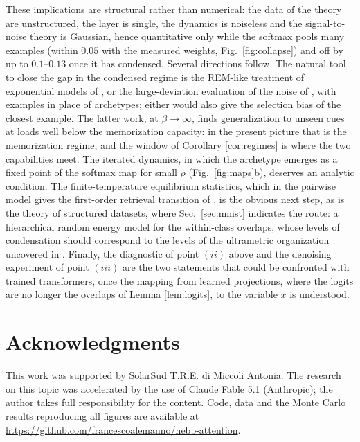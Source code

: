 \documentclass[11pt,a4paper]{article}
\begin{document}
These implications are structural rather than numerical: the data of the theory are unstructured, the layer is single, the dynamics is noiseless and the signal-to-noise theory is Gaussian, hence quantitative only while the softmax pools many examples (within $0.05$ with the measured weights, Fig.\ \ref{fig:collapse}) and off by up to $0.1$--$0.13$ once it has condensed. Several directions follow. The natural tool to close the gap in the condensed regime is the REM-like treatment of exponential models of \cite{Lucibello2024}, or the large-deviation evaluation of the noise of \cite{Agliari2026hetero}, with examples in place of archetypes; either would also give the selection bias of the closest example. The latter work, at $\beta\to\infty$, finds generalization to unseen cues at loads well below the memorization capacity: in the present picture that is the memorization regime, and the window of Corollary \ref{cor:regimes} is where the two capabilities meet. The iterated dynamics, in which the archetype emerges as a fixed point of the softmax map for small $\rho$ (Fig.\ \ref{fig:maps}b), deserves an analytic condition. The finite-temperature equilibrium statistics, which in the pairwise model gives the first-order retrieval transition of \cite{Alemanno2023}, is the obvious next step, as is the theory of structured datasets, where Sec.\ \ref{sec:mnist} indicates the route: a hierarchical random energy model \cite{Derrida1985,DerridaGardner1986} for the within-class overlaps, whose levels of condensation should correspond to the levels of the ultrametric organization uncovered in \cite{Alemanno2023}. Finally, the diagnostic of point $(ii)$ above and the denoising experiment of point $(iii)$ are the two statements that could be confronted with trained transformers, once the mapping from learned projections, where the logits are no longer the overlaps of Lemma \ref{lem:logits}, to the variable $x$ is understood.

\section*{Acknowledgments}
This work was supported by SolarSud T.R.E. di Miccoli Antonia. The research on this topic was accelerated by the use of Claude Fable 5.1 (Anthropic); the author takes full responsibility for the content. Code, data and the Monte Carlo results reproducing all figures are available at \url{https://github.com/francescoalemanno/hebb-attention}.



\end{document}
